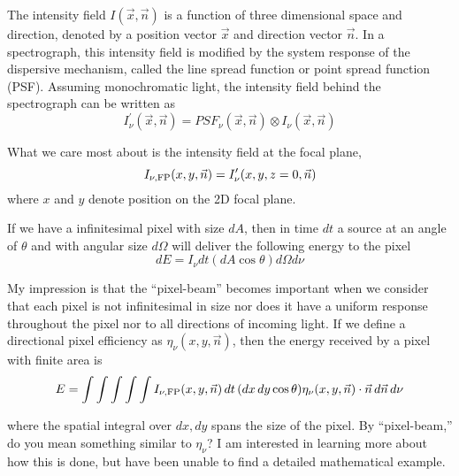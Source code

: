 \documentclass[preprint]{aastex} %
\begin{document}
The intensity field $I(\vec{x}, \vec{n})$ is a function of three dimensional space and direction, denoted by a position vector $\vec{x}$ and direction vector $\vec{n}$.  In a spectrograph, this intensity field is modified by the system response of the dispersive mechanism, called the line spread function or point spread function (PSF). Assuming monochromatic light, the intensity field behind the spectrograph can be written as
\begin{equation}
  I^\prime_\nu(\vec{x}, \vec{n}) = PSF_\nu(\vec{x}, \vec{n}) \otimes I_\nu(\vec{x}, \vec{n})
\end{equation}

What we care most about is the intensity field at the focal plane, 
\begin{equation}
  I_{\nu, {\rm FP}}(x, y, \vec{n}) = I^\prime_\nu(x, y, z=0, \vec{n})
\end{equation}
where $x$ and $y$ denote position on the 2D focal plane.

If we have a infinitesimal pixel with size $dA$, then in time $dt$ a source at an angle of $\theta$ and with angular size $d\Omega$ will deliver the following energy to the pixel
\begin{equation}
  dE = I_\nu dt (dA \cos \theta) d\Omega d\nu
\end{equation}

My impression is that the ``pixel-beam'' becomes important when we consider that each pixel is not infinitesimal in size nor does it have a uniform response throughout the pixel nor to all directions of incoming light. If we define a directional pixel efficiency as $\eta_\nu(x, y, \vec{n})$, then the energy received by a pixel with finite area is
\begin{equation}
  E = \int \int \int \int \int I_{\nu, {\rm FP}} (x, y, \vec{n})\, dt\, (dx\,dy \cos \theta) \eta_\nu(x, y, \vec{n}) \cdot \vec{n} \, d\vec{n}\, d\nu
\end{equation}

where the spatial integral over $dx, dy$ spans the size of the pixel. By ``pixel-beam,'' do you mean something similar to $\eta_\nu$? I am interested in learning more about how this is done, but have been unable to find a detailed mathematical example.
\end{document}
